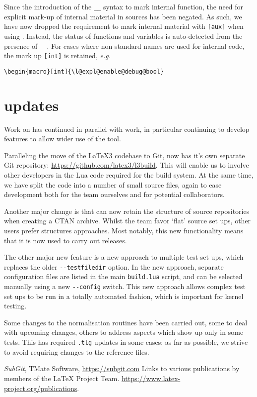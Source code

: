 \documentclass{ltnews}
\begin{document}
Since the introduction of the \verb|__| syntax to mark internal function, the
need for explicit mark-up of internal material in sources has been negated.
As such, we have now dropped the requirement to mark internal material with
\verb|[aux]| when using . Instead, the status of functions and
variables is auto-detected from the presence of \verb|__|. For cases where
non-standard names are used for internal code, the mark up \verb|[int]| is
retained, \emph{e.g.}
\begin{verbatim}
\begin{macro}[int]{\l@expl@enable@debug@bool}
\end{verbatim}

\section{ updates}

Work on  has continued in parallel with  work, in
particular continuing to develop features to allow wider use of the tool.

Paralleling the move of the \LaTeX3 codebase to Git,  now has it's
own separate Git repository: \url{https://github.com/latex3/l3build}. This will
enable us to involve other developers in the Lua code required for the build
system. At the same time, we have split the code into a number of small source
files, again to ease development both for the team ourselves and for potential
collaborators.

Another major change is that  can now retain the structure of
source repositories when creating a CTAN archive. Whilst the team favor `flat'
source set ups, other users prefer structures approaches. Most notably, this
new  functionality means that it is now used to carry out
 releases.

The other major new feature is a new approach to multiple test set ups, which
replaces the older \verb|--testfiledir| option. In the new approach, separate
configuration files are listed in the main \verb|build.lua| script, and can be
selected manually using a new \verb|--config| switch. This new approach allows
complex test set ups to be run in a totally automated fashion, which is
important for kernel testing.

Some changes to the normalisation routines have been carried out, some to deal
with upcoming  changes, others to address aspects which show up
only in some tests. This has required \verb|.tlg| updates in some cases: as far
as possible, we strive to avoid requiring changes to the reference files.

\begin{thebibliography}{10}
  \raggedright
    \emph{SubGit}, TMate Software, \url{https://subgit.com}
    Links to various publications by members of the \LaTeX{} Project Team.
    \newblock \url{https://www.latex-project.org/publications}.
\end{thebibliography}
\end{document}
